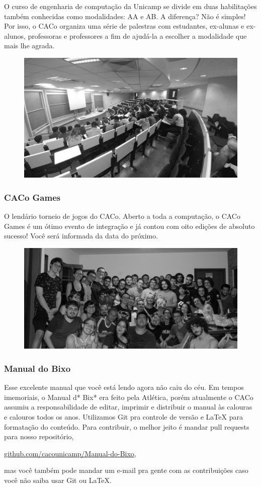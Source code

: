 O curso de engenharia de computação da Unicamp se divide em duas habilitações
também conhecidas como modalidades: AA e AB. A diferença? Não é simples! Por
isso, o CACo organiza uma série de palestras com estudantes, ex-alunas e
ex-alunos, professoras e professores a fim de ajudá-la a escolher a modalidade
que mais lhe agrada.

\begin{figure}[H]
  \centering
  \includegraphics[width=.45\textwidth]{img/alem_da_graduacao/caco_aaab.jpg}
\end{figure}


\subsubsection{CACo Games}

O lendário torneio de jogos do CACo. Aberto a toda a computação, o CACo Games é 
um ótimo evento de integração e já contou com oito edições de absoluto sucesso! 
Você será informada da data do próximo.

\begin{figure}[H]
  \centering
  \includegraphics[width=.45\textwidth]{img/alem_da_graduacao/caco_games.jpg}
\end{figure}

\subsubsection{Manual do Bixo}

Esse excelente manual que você está lendo agora não caiu do céu. Em tempos
imemoriais, o Manual d* Bix* era feito pela Atlética, porém atualmente o CACo
assumiu a responsabilidade de editar, imprimir e distribuir o manual às
calouras e calouros todos os anos. Utilizamos Git pra controle de versão e
{\LaTeX} para formatação do conteúdo. Para contribuir, o melhor jeito é mandar
pull requests para nosso repositório,
\begin{center}
\url{github.com/cacounicamp/Manual-do-Bixo},\\
\end{center}
mas você também pode mandar um e-mail pra gen\-te com as contribuições caso
você não saiba usar Git ou \LaTeX.

